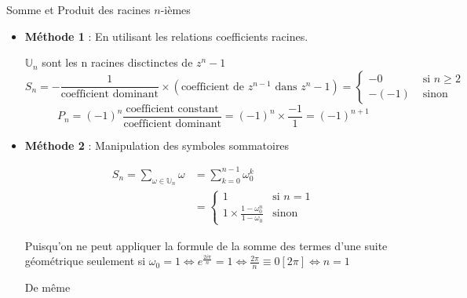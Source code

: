 \documentclass{article}
\renewenvironment{question_kholle}[2][ ]
{
	\subsection{\texorpdfstring{#2}{}}
	\notblank{#1}
	{
		\noindent #1
		\bigbreak
	}
	{}
	\begin{proof}
}
{
	\end{proof}
}
\begin{document}
\pagebreak
\begin{question_kholle}{Somme et Produit des racines $n$-ièmes}
	\;\\
	\begin{itemize}[label=$\lozenge$]
		\item \textbf{Méthode 1} : En utilisant les relations coefficients racines.

		      $\mathbb{U}_{n}$ sont les n racines disctinctes de $z^{n}-1$
		      $$S_{n} = - \frac{1}{\text{coefficient dominant}}\times(\text{coefficient de }z^{n-1} \text{ dans }z^{n}-1)= \left\{ \begin{array}{ll}
				      -0    & \text{ si }  n\geqslant 2 \\
				      -(-1) & \text{ sinon}
			      \end{array}\right.$$
		      $$
			      P_{n} = (-1)^{n} \frac{\text{coefficient constant}}{\text{coefficient dominant}} = (-1) ^{n}\times \frac{-1}{1} = (-1)^{n+1}
		      $$

		\item \textbf{Méthode 2} : Manipulation des symboles sommatoires

		      \begin{align*}
			      S_{n} = \sum_{\omega \in \mathbb{U}_{n}}\omega & = \sum_{k=0}^{n-1}\omega_{0}^{k}                                                                    \\
			                                                     & = \left\{ \begin{array}{ll}
				                                                                 1                                                & \text{si }  n =1 \\
				                                                                 1 \times \frac{1 - \omega_{0}^{n}}{1-\omega_{0}} & \text{sinon}
			                                                                 \end{array}\right.
		      \end{align*}

		      Puisqu'on ne peut appliquer la formule de la somme des termes d'une suite géométrique seulement si $\omega_{0} = 1 \iff e^{\frac{2i\pi}{n}} = 1 \iff \frac{2\pi}{n} \equiv 0 [2\pi] \iff n = 1$

		      De même


\end{itemize}
\end{question_kholle}
\end{document}
